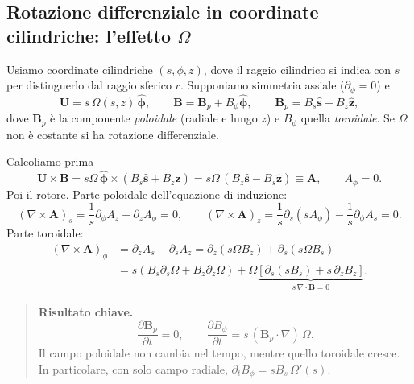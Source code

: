 \subsection{Rotazione differenziale in coordinate cilindriche: l'effetto $\Omega$}

Usiamo coordinate cilindriche $(s,\phi,z)$, dove il raggio cilindrico si indica con $s$ per distinguerlo dal raggio sferico $r$. Supponiamo simmetria assiale ($\partial_\phi=0$) e
\begin{equation}
\mathbf{U}=s\,\Omega(s,z)\,\hat{\boldsymbol{\phi}},\qquad
\mathbf{B}=\mathbf{B}_p+B_\phi\hat{\boldsymbol{\phi}},\qquad
\mathbf{B}_p=B_s\hat{\mathbf{s}}+B_z\hat{\mathbf{z}},
\end{equation}
dove $\mathbf{B}_p$ è la componente \emph{poloidale} (radiale e lungo $z$) e $B_\phi$ quella \emph{toroidale}. Se $\Omega$ non è costante si ha rotazione differenziale.

Calcoliamo prima
\begin{equation}
\mathbf{U}\times\mathbf{B}=s\Omega\,\hat{\boldsymbol{\phi}}\times(B_s\hat{\mathbf{s}}+B_z\hat{\mathbf{z}})=s\Omega\,(B_z\hat{\mathbf{s}}-B_s\hat{\mathbf{z}})\equiv\mathbf{A},\qquad A_\phi=0 .
\end{equation}
Poi il rotore. Parte poloidale dell'equazione di induzione:
\begin{equation}
(\nabla\times\mathbf{A})_s=\frac{1}{s}\partial_\phi A_z-\partial_zA_\phi=0,\qquad
(\nabla\times\mathbf{A})_z=\frac{1}{s}\partial_s(sA_\phi)-\frac{1}{s}\partial_\phi A_s=0 .
\end{equation}
Parte toroidale:
\begin{align}
(\nabla\times\mathbf{A})_\phi&=\partial_zA_s-\partial_sA_z=\partial_z(s\Omega B_z)+\partial_s(s\Omega B_s)\nonumber\\
&=s\left(B_s\partial_s\Omega+B_z\partial_z\Omega\right)+\Omega\underbrace{\left[\partial_s(sB_s)+s\,\partial_zB_z\right]}_{s\,\nabla\cdot\mathbf{B}=0}.
\end{align}

\begin{quote}
\textbf{Risultato chiave.}
\[
\frac{\partial\mathbf{B}_p}{\partial t}=0,\qquad\frac{\partial B_\phi}{\partial t}=s\,(\mathbf{B}_p\cdot\nabla)\,\Omega .
\]
Il campo poloidale non cambia nel tempo, mentre quello toroidale cresce. In particolare, con solo campo radiale, $\partial_tB_\phi=sB_s\,\Omega'(s)$.
\end{quote}

